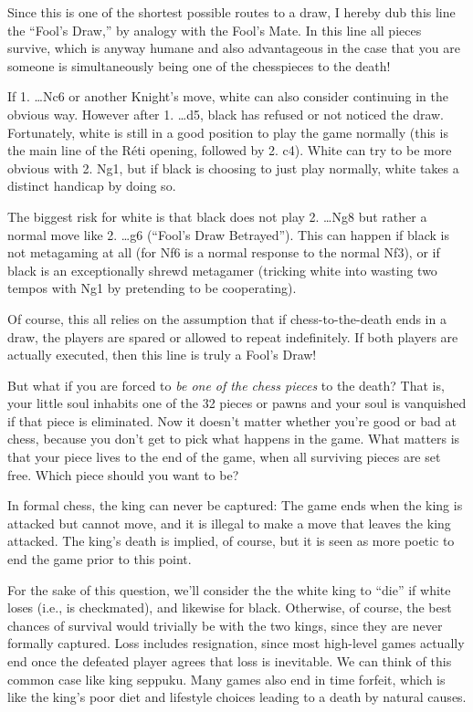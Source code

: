 \documentclass[twocolumn]{article}
\begin{document}
{  Since this is one of the shortest possible routes to a draw, I
  hereby dub this line the ``Fool's Draw,'' by analogy with the Fool's
  Mate. In this line all pieces survive, which is anyway humane and
  also advantageous in the case that you are someone is simultaneously
  being one of the chesspieces to the death!

  If 1. \ldots Nc6 or another Knight's move, white can also consider
  continuing in the obvious way. However after 1. \ldots d5, black has
  refused or not noticed the draw. Fortunately, white is still in a
  good position to play the game normally (this is the main line of
  the R\'eti opening, followed by 2. c4). White can try to be more
  obvious with 2. Ng1, but if black is choosing to just play normally,
  white takes a distinct handicap by doing so.

  The biggest risk for white is that black does not play 2. \ldots Ng8
  but rather a normal move like 2. \ldots g6 (``Fool's Draw Betrayed'').
  This can happen if black is not metagaming at all (for Nf6 is a
  normal response to the normal Nf3), or if black is an exceptionally
  shrewd metagamer (tricking white into wasting two tempos with Ng1
  by pretending to be cooperating).

  Of course, this all relies on the assumption that if
  chess-to-the-death ends in a draw, the players are spared or allowed
  to repeat indefinitely. If both players are actually executed, then
  this line is truly a Fool's Draw!
}

But what if you are forced to {\it be one of the chess pieces} to the
death? That is, your little soul inhabits one of the 32 pieces or
pawns and your soul is vanquished if that piece is eliminated. Now it
doesn't matter whether you're good or bad at chess, because you don't
get to pick what happens in the game. What matters is that your piece
lives to the end of the game, when all surviving pieces are set free.
Which piece should you want to be?

In formal chess, the king can never be captured: The game ends when
the king is attacked but cannot move, and it is illegal to make a move
that leaves the king attacked. The king's death is implied, of course,
but it is seen as more poetic to end the game prior to this point.

For the sake of this question, we'll consider the the white king to
``die'' if white loses (i.e., is checkmated), and likewise for black.
Otherwise, of course, the best chances of survival would trivially be
with the two kings, since they are never formally captured. Loss
includes resignation, since most high-level games actually end once
the defeated player agrees that loss is inevitable. We can think of
this common case like king seppuku. Many games also end in time
forfeit, which is like the king's poor diet and lifestyle choices
leading to a death by natural causes.
\end{document}
